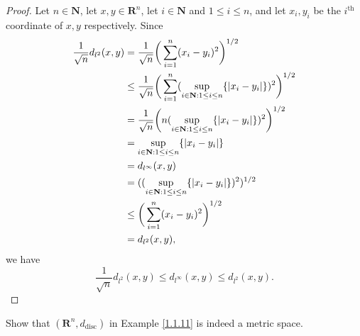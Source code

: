 \begin{proof}
    Let \(n \in \mathbf{N}\), let \(x, y \in \mathbf{R}^n\), let \(i \in \mathbf{N}\) and \(1 \leq i \leq n\), and let \(x_i, y_i\) be the \(i^{\text{th}}\) coordinate of \(x, y\) respectively.
    Since
    \begin{align*}
        \frac{1}{\sqrt{n}} d_{l^2}(x, y) & = \frac{1}{\sqrt{n}} \bigg(\sum_{i = 1}^n (x_i - y_i)^2\bigg)^{1 / 2}                                                         \\
                                         & \leq \frac{1}{\sqrt{n}} \bigg(\sum_{i = 1}^n (\sup_{i \in \mathbf{N} : 1 \leq i \leq n} \{\abs*{x_i - y_i}\})^2\bigg)^{1 / 2} \\
                                         & = \frac{1}{\sqrt{n}} \bigg(n (\sup_{i \in \mathbf{N} : 1 \leq i \leq n} \{\abs*{x_i - y_i}\})^2\bigg)^{1 / 2}                 \\
                                         & = \sup_{i \in \mathbf{N} : 1 \leq i \leq n} \{\abs*{x_i - y_i}\}                                                              \\
                                         & = d_{l^\infty}(x, y)                                                                                                          \\
                                         & = ((\sup_{i \in \mathbf{N} : 1 \leq i \leq n} \{\abs*{x_i - y_i}\})^2)^{1 / 2}                                                \\
                                         & \leq \bigg(\sum_{i = 1}^n (x_i - y_i)^2\bigg)^{1 / 2}                                                                         \\
                                         & = d_{l^2}(x, y),
    \end{align*}
    we have
    \[
        \frac{1}{\sqrt{n}} d_{l^2}(x, y) \leq d_{l^\infty}(x, y) \leq d_{l^2}(x, y).
    \]
\end{proof}

\begin{exercise}\label{ex 1.1.11}
    Show that \((\mathbf{R}^n, d_{\text{disc}})\) in Example \ref{1.1.11} is indeed a metric space.
\end{exercise}

